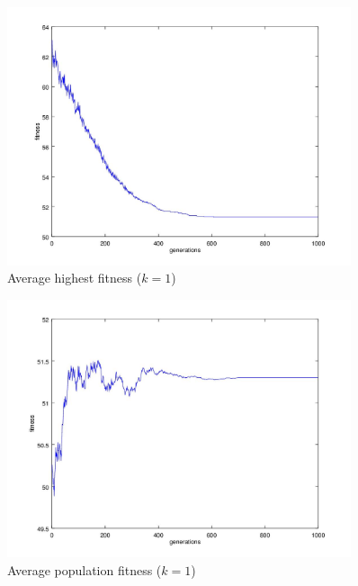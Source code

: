 \documentclass{article}
\begin{document}
\begin{figure}

\centering
\includegraphics[keepaspectratio,width=0.9\textwidth]{experiment1figure4.jpg}

\caption{Average highest fitness ($k = 1$)}

\label{fig:experiment1f4}

\end{figure}

\begin{figure}

\centering
\includegraphics[keepaspectratio,width=0.9\textwidth]{experiment1figure3.jpg}

\caption{Average population fitness ($k = 1$)}

\label{fig:experiment1f3}

\end{figure}
\end{document}
